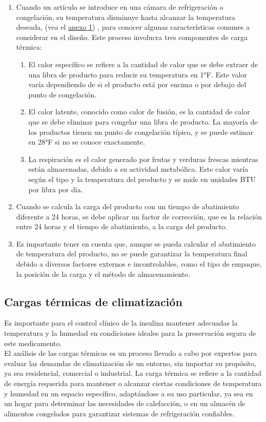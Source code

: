 \begin{enumerate}
	\item Cuando un artículo se introduce en una cámara de refrigeración o congelación, su temperatura disminuye hasta alcanzar la temperatura deseada, (vea el \hyperref[anexo:bohn-perecederos]{anexo 1})  , para conocer algunas características comunes a considerar en el diseño. Este proceso involucra tres componentes de carga térmica:
	\begin{enumerate}
		\item El calor específico se refiere a la cantidad de calor que se debe extraer de una libra de producto para reducir su temperatura en 1°F. Este valor varía dependiendo de si el producto está por encima o por debajo del punto de congelación.
		\item El calor latente, conocido como calor de fusión, es la cantidad de calor que se debe eliminar para congelar una libra de producto. La mayoría de los productos tienen un punto de congelación típico, y se puede estimar en 28°F si no se conoce exactamente.
		\item La respiración es el calor generado por frutas y verduras frescas mientras están almacenadas, debido a su actividad metabólica. Este calor varía según el tipo y la temperatura del producto y se mide en unidades BTU por libra por día.
	\end{enumerate}
	\item Cuando se calcula la carga del producto con un tiempo de abatimiento diferente a 24 horas, se debe aplicar un factor de corrección, que es la relación entre 24 horas y el tiempo de abatimiento, a la carga del producto.
	\item Es importante tener en cuenta que, aunque se pueda calcular el abatimiento de temperatura del producto, no se puede garantizar la temperatura final debido a diversos factores externos e incontrolables, como el tipo de empaque, la posición de la carga y el método de almacenamiento.
\end{enumerate}
\subsection{Cargas térmicas de climatización}
Es importante para el control clínico de la insulina mantener adecuadas la temperatura y la humedad en condiciones ideales para la preservación segura de este medicamento.\\  
El análisis de las cargas térmicas es un proceso llevado a cabo por expertos para evaluar las demandas de climatización de un entorno, sin importar su propósito, ya sea residencial, comercial o industrial.
La carga térmica se refiere a la cantidad de energía requerida para mantener o alcanzar ciertas condiciones de temperatura y humedad en un espacio específico, adaptándose a su uso particular, ya sea en un hogar para determinar las necesidades de calefacción, o en un almacén de alimentos congelados para garantizar sistemas de refrigeración confiables. \cite{sampp-2023}
